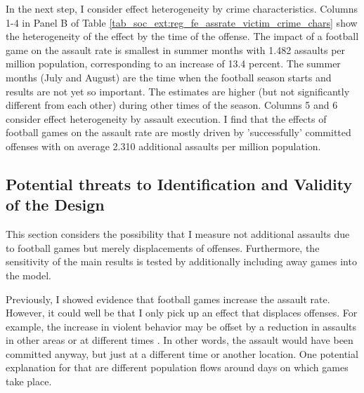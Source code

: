 

In the next step, I consider effect heterogeneity by crime characteristics. Columns 1-4 in Panel B of Table \ref{tab_soc_ext:reg_fe_assrate_victim_crime_chars} show the heterogeneity of the effect by the time of the offense. The impact of a football game on the assault rate is smallest in summer months with 1.482 assaults per million population, corresponding to an increase of 13.4 percent. The summer months (July and August) are the time when the football season starts and results are not yet so important. The estimates are higher (but not significantly different from each other) during other times of the season. Columns 5 and 6 consider effect heterogeneity by assault execution. I find that the effects of football games on the assault rate are mostly driven by 'successfully' committed offenses with on average 2.310 additional assaults per million population.




\subsection{Potential threats to Identification and Validity of the Design}
This section considers the possibility that I measure not additional assaults due to football games but merely displacements of offenses. Furthermore, the sensitivity of the main results is tested by additionally including away games into the model.

Previously, I showed evidence that football games increase the assault rate. However, it could well be that I only pick up an effect that displaces offenses. For example, the increase in violent behavior may be offset by a reduction in assaults in other areas or at different times \citep{lindo2018college}. In other words, the assault would have been committed anyway, but just at a different time or another location. One potential explanation for that are different population flows around days on which games take place.



